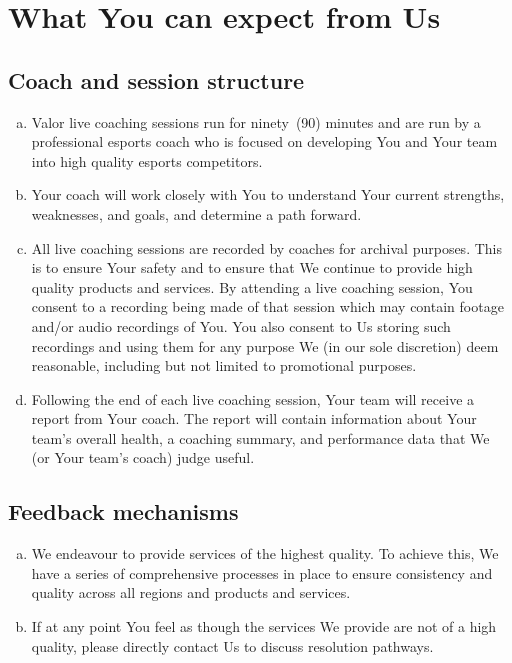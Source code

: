 \documentclass[10pt]{article}
\begin{document}
\section{What You can expect from Us}
\subsection{Coach and session structure}
\begin{enumerate}[(a)]
\item
Valor live coaching sessions run for ninety~(90) minutes and are run by a professional esports coach who is focused on developing You and Your team into high quality esports competitors.

\item
Your coach will work closely with You to understand Your current strengths, weaknesses, and goals, and determine a path forward.

\item
All live coaching sessions are recorded by coaches for archival purposes. This is to ensure Your safety and to ensure that We continue to provide high quality products and services. By attending a live coaching session, You consent to a recording being made of that session which may contain footage and/or audio recordings of You. You also consent to Us storing such recordings and using them for any purpose We (in our sole discretion) deem reasonable, including but not limited to promotional purposes.

\item
Following the end of each live coaching session, Your team will receive a report from Your coach. The report will contain information about Your team's overall health, a coaching summary, and performance data that We (or Your team's coach) judge useful.
\end{enumerate}

\subsection{Feedback mechanisms}
\begin{enumerate}[(a)]
\item
We endeavour to provide services of the highest quality. To achieve this, We have a series of comprehensive processes in place to ensure consistency and quality across all regions and products and services.

\item
If at any point You feel as though the services We provide are not of a high quality, please directly contact Us to discuss resolution pathways.
\end{enumerate}
\end{document}
